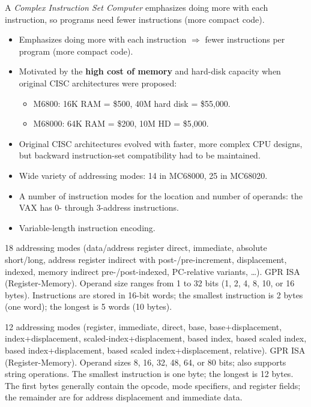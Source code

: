 \begin{definition}[CISC]
A \emph{Complex Instruction Set Computer} emphasizes doing more with each
instruction, so programs need fewer instructions (more compact code).
\end{definition}
\begin{itemize}
  \item Emphasizes doing more with each instruction $\Rightarrow$ fewer
  instructions per program (more compact code).
  \item Motivated by the \textbf{high cost of memory} and hard-disk capacity
  when original CISC architectures were proposed:
  \begin{itemize}
    \item M6800: 16K RAM = \$500, 40M hard disk = \$55{,}000.
    \item M68000: 64K RAM = \$200, 10M HD = \$5{,}000.
  \end{itemize}
  \item Original CISC architectures evolved with faster, more complex CPU
  designs, but backward instruction-set compatibility had to be maintained.
  \item Wide variety of addressing modes: 14 in MC68000, 25 in MC68020.
  \item A number of instruction modes for the location and number of
  operands: the VAX has 0- through 3-address instructions.
  \item Variable-length instruction encoding.
\end{itemize}

\begin{eg}[Motorola 680X0]
18 addressing modes (data/address
register direct, immediate, absolute short/long, address register indirect
with post-/pre-increment, displacement, indexed, memory indirect
pre-/post-indexed, PC-relative variants, \dots). GPR ISA (Register-Memory).
Operand size ranges from 1 to 32 bits (1, 2, 4, 8, 10, or 16 bytes).
Instructions are stored in 16-bit words; the smallest instruction is 2 bytes
(one word); the longest is 5 words (10 bytes).
\end{eg}

\begin{eg}[Intel IA-32, x86 (80386)]
12 addressing modes
(register, immediate, direct, base, base+displacement,
index+displacement, scaled-index+displacement, based index, based scaled
index, based index+displacement, based scaled index+displacement,
relative). GPR ISA (Register-Memory). Operand sizes 8, 16, 32, 48, 64, or 80
bits; also supports string operations. The smallest instruction is one
byte; the longest is 12 bytes. The first bytes generally contain the
opcode, mode specifiers, and register fields; the remainder are for address
displacement and immediate data.
\end{eg}

